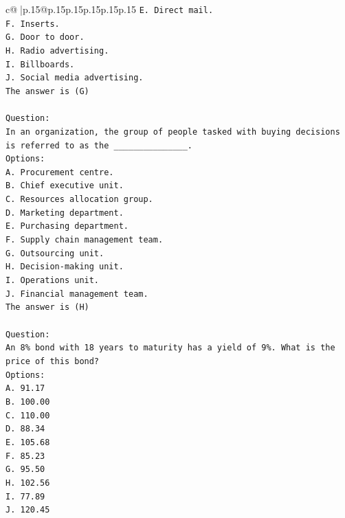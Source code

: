 \documentclass{article}
\begin{document}
{\begin{supertabular}{c@{$\;$}|p{.15\linewidth}@{}p{.15\linewidth}p{.15\linewidth}p{.15\linewidth}p{.15\linewidth}p{.15\linewidth}}
{{{\texttt{E. Direct mail.} \\
\texttt{F. Inserts.} \\
\texttt{G. Door to door.} \\
\texttt{H. Radio advertising.} \\
\texttt{I. Billboards.} \\
\texttt{J. Social media advertising.} \\
\texttt{The answer is (G)} \\
\\ 
\texttt{Question:} \\
\texttt{In an organization, the group of people tasked with buying decisions is referred to as the \_\_\_\_\_\_\_\_\_\_\_\_\_\_\_.} \\
\texttt{Options:} \\
\texttt{A. Procurement centre.} \\
\texttt{B. Chief executive unit.} \\
\texttt{C. Resources allocation group.} \\
\texttt{D. Marketing department.} \\
\texttt{E. Purchasing department.} \\
\texttt{F. Supply chain management team.} \\
\texttt{G. Outsourcing unit.} \\
\texttt{H. Decision{-}making unit.} \\
\texttt{I. Operations unit.} \\
\texttt{J. Financial management team.} \\
\texttt{The answer is (H)} \\
\\ 
\texttt{Question:} \\
\texttt{An 8\% bond with 18 years to maturity has a yield of 9\%. What is the price of this bond?} \\
\texttt{Options:} \\
\texttt{A. 91.17} \\
\texttt{B. 100.00} \\
\texttt{C. 110.00} \\
\texttt{D. 88.34} \\
\texttt{E. 105.68} \\
\texttt{F. 85.23} \\
\texttt{G. 95.50} \\
\texttt{H. 102.56} \\
\texttt{I. 77.89} \\
\texttt{J. 120.45} \\
            }
        }
    }
     \\ \\


\end{supertabular}}
\end{document}
